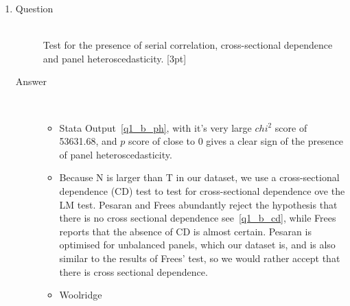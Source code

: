 \documentclass{article}
\begin{document}
\begin{enumerate}
\begin{enumerate}[label=(\alph*)]
\begin{description}
\begin{itemize}
      \end{itemize}
      
    \end{description}
    
    
    \item %
    \begin{description}
      \item[Question] \hfill \\
      Test for the presence of serial correlation, cross-sectional dependence and panel heteroscedasticity. [3pt]
      \item[Answer] \hfill \\
      \begin{itemize}
        \item Stata Output~\ref{q1_b_ph}, with it's very large \(chi^2\) score of 53631.68, and \(p\) score of close to 0 gives a clear sign of the presence of panel heteroscedasticity.
        \begin{figure}[h]
      
      \end{figure}
        \item Because N is larger than T in our dataset, we use a cross-sectional dependence (CD) test to test for cross-sectional dependence ove the LM test.
        Pesaran and Frees abundantly reject the hypothesis that there is no cross sectional dependence see~\ref{q1_b_cd}, while Frees reports that the absence of CD is almost certain. Pesaran is optimised for unbalanced panels, which our dataset is, and is also similar to the results of Frees' test, so we would rather accept that there is cross sectional dependence.
      \begin{figure}[h]
      
      \end{figure}
      \item Woolridge
      \begin{figure}[h]
      
      \end{figure}
      \end{itemize}
    \end{description}
    

\end{enumerate}
\end{enumerate}
\end{document}
